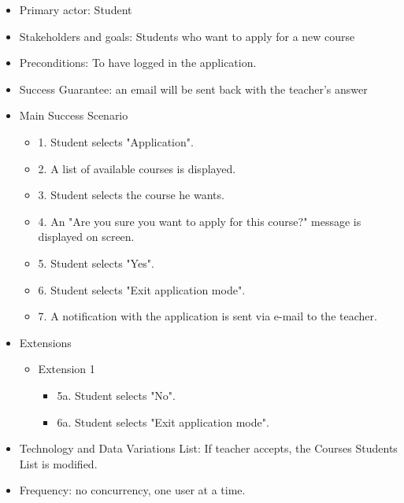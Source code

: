 \documentclass{article}
\begin{document}
\begin{enumerate}
\begin{enumerate}
\begin{enumerate}
			
			\begin{itemize}
				\item Primary actor: Student
				\item Stakeholders and goals: Students who want to apply for a new course
				\item Preconditions: To have logged in the application.
				\item Success Guarantee: an email will be sent back with the teacher's answer
				\item Main Success Scenario
				\begin{itemize}
					\item 1. Student selects "Application".
					\item 2. A list of available courses is displayed.
					\item 3. Student selects the course he wants.
					\item 4. An "Are you sure you want to apply for this course?" message is displayed on screen.
					\item 5. Student selects "Yes".
					\item 6. Student selects "Exit application mode".
					\item 7. A notification with the application is sent via e-mail to the teacher.
				\end{itemize}
				\item Extensions
				\begin{itemize}
					\item Extension 1
					\begin{itemize}
						\item 5a. Student selects "No".
						\item 6a. Student selects "Exit application mode".
					\end{itemize}
					
				\end{itemize}
				\item Technology and Data Variations List: If teacher accepts, the Courses Students List is modified.
				\item Frequency: no concurrency, one user at a time.
				
			\end{itemize}
		\end{enumerate}
	\end{enumerate}
	
	

\end{enumerate}
\end{document}
